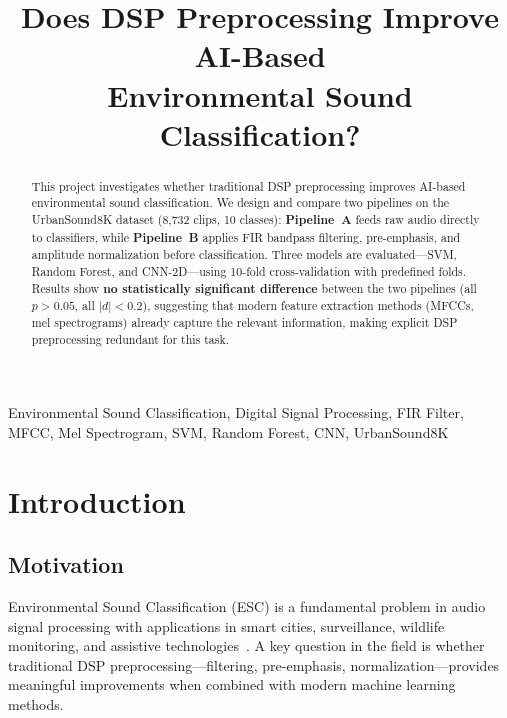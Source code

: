 \documentclass[conference]{IEEEtran}
\newcommand{\pipeA}{\textbf{Pipeline~A}}
\newcommand{\pipeB}{\textbf{Pipeline~B}}
\newcommand{\US}{UrbanSound8K}
\begin{document}
\title{Does DSP Preprocessing Improve AI-Based\\Environmental Sound Classification?}

\author{
}

\maketitle

\begin{abstract}
This project investigates whether traditional DSP preprocessing improves AI-based environmental sound classification. We design and compare two pipelines on the \US{} dataset (8,732 clips, 10 classes): \pipeA{} feeds raw audio directly to classifiers, while \pipeB{} applies FIR bandpass filtering, pre-emphasis, and amplitude normalization before classification. Three models are evaluated---SVM, Random Forest, and CNN-2D---using 10-fold cross-validation with predefined folds. Results show \textbf{no statistically significant difference} between the two pipelines (all $p > 0.05$, all $|d| < 0.2$), suggesting that modern feature extraction methods (MFCCs, mel spectrograms) already capture the relevant information, making explicit DSP preprocessing redundant for this task.
\end{abstract}

\begin{IEEEkeywords}
Environmental Sound Classification, Digital Signal Processing, FIR Filter, MFCC, Mel Spectrogram, SVM, Random Forest, CNN, UrbanSound8K
\end{IEEEkeywords}

\section{Introduction}
\label{sec:intro}

\subsection{Motivation}

Environmental Sound Classification (ESC) is a fundamental problem in audio signal processing with applications in smart cities, surveillance, wildlife monitoring, and assistive technologies~\cite{salamon2014}. A key question in the field is whether traditional DSP preprocessing---filtering, pre-emphasis, normalization---provides meaningful improvements when combined with modern machine learning methods.
\end{document}
